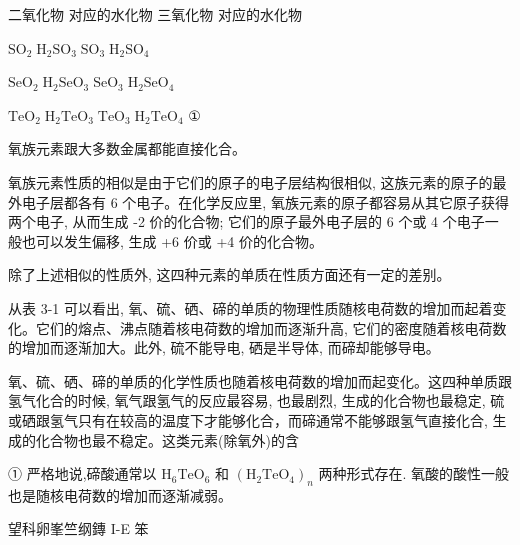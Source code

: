 \documentclass[10pt]{article}
\begin{document}
二氧化物 对应的水化物 三氧化物 对应的水化物

\({\text{SO}}_{2}\;{\text{H}}_{2}{\text{SO}}_{3}\;{\text{SO}}_{3}\;{\text{H}}_{2}{\text{SO}}_{4}\)

\({\text{SeO}}_{2}\;{\text{H}}_{2}{\text{SeO}}_{3}\;{\text{SeO}}_{3}\;{\text{H}}_{2}{\text{SeO}}_{4}\)

\({\text{TeO}}_{2}\;{\text{H}}_{2}{\text{TeO}}_{3}\;{\text{TeO}}_{3}\;{\text{H}}_{2}{\text{TeO}}_{4}\) ①

氧族元素跟大多数金属都能直接化合。

氧族元素性质的相似是由于它们的原子的电子层结构很相似, 这族元素的原子的最外电子层都各有 6 个电子。在化学反应里, 氧族元素的原子都容易从其它原子获得两个电子, 从而生成 -2 价的化合物; 它们的原子最外电子层的 6 个或 4 个电子一般也可以发生偏移, 生成 +6 价或 +4 价的化合物。

除了上述相似的性质外, 这四种元素的单质在性质方面还有一定的差别。

从表 3-1 可以看出, 氧、硫、硒、碲的单质的物理性质随核电荷数的增加而起着变化。它们的熔点、沸点随着核电荷数的增加而逐渐升高, 它们的密度随着核电荷数的增加而逐渐加大。此外, 硫不能导电, 硒是半导体, 而碲却能够导电。

氧、硫、硒、碲的单质的化学性质也随着核电荷数的增加而起变化。这四种单质跟氢气化合的时候, 氧气跟氢气的反应最容易, 也最剧烈, 生成的化合物也最稳定, 硫或硒跟氢气只有在较高的温度下才能够化合，而碲通常不能够跟氢气直接化合, 生成的化合物也最不稳定。这类元素(除氧外)的含

① 严格地说,碲酸通常以 \({\mathrm{H}}_{6}{\mathrm{{TeO}}}_{6}\) 和 \({\left( {\mathrm{H}}_{2}{\mathrm{{TeO}}}_{4}\right) }_{n}\) 两种形式存在. 氧酸的酸性一般也是随核电荷数的增加而逐渐减弱。

望科卵峯竺纲鏄 I-E 笨
\end{document}
